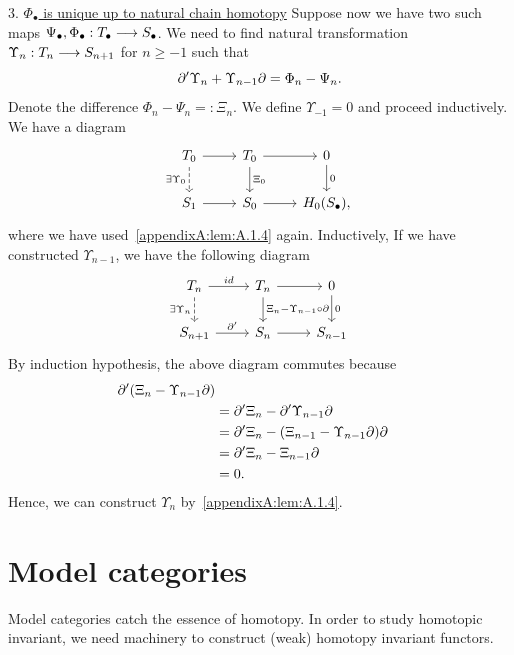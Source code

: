 \documentclass[11pt]{book} %
\begin{document}
3. \underline{$\Phi_\bullet$ is unique up to natural chain homotopy} Suppose now we have two such maps $\Psi_\bullet,\Phi_\bullet: T_\bullet\longrightarrow S_\bullet$. We need to find natural transformation $\Upsilon_n: T_{n}\longrightarrow S_{n+1}$ for $n\geq -1$ such that 
$$
{\partial}'\Upsilon_n+\Upsilon_{n-1}{\partial}=\Phi_n-\Psi_n.
$$
Denote the difference $\Phi_n-\Psi_n=:\Xi_n$. We define $\Upsilon_{-1}=0$ and proceed inductively. We have a diagram
\[
\begin{tikzcd}
T_0 \arrow[r] \arrow[d, "\exists\Upsilon_0"', dashed] & T_0 \arrow[d, "\Xi_0"] \arrow[r] & 0 \arrow[d, "0"] \\
S_1 \arrow[r] & S_0 \arrow[r] & H_0(S_\bullet),
\end{tikzcd}
\]
where we have used~\ref{appendixA:lem:A.1.4} again. Inductively, If we have constructed $\Upsilon_{n-1}$, we have the following diagram
\[
\begin{tikzcd}
T_n \arrow[r, "id"] \arrow[d, "\exists \Upsilon_{n}"', dashed] & T_n \arrow[d, "\Xi_n-\Upsilon_{n-1}\circ\pd"] \arrow[r] & 0 \arrow[d, "0"] \\
S_{n+1} \arrow[r, "\pd'"] & S_n \arrow[r] & S_{n-1}
\end{tikzcd}
\] 
By induction hypothesis, the above diagram commutes because
$$
\begin{aligned}
{\partial}'(\Xi_n-\Upsilon_{n-1}{\partial})\\
&={\partial}'\Xi_n-{\partial}'\Upsilon_{n-1}{\partial}\\
&={\partial}'\Xi_n-(\Xi_{n-1}-\Upsilon_{n-1}{\partial}){\partial}\\
&={\partial}'\Xi_n-\Xi_{n-1}{\partial}\\
&=0.
\end{aligned}
$$
Hence, we can construct $\Upsilon_{n}$ by~\ref{appendixA:lem:A.1.4}.





\section{Model categories}
Model categories catch the essence of homotopy. In order to study homotopic invariant, we need machinery to construct (weak) homotopy invariant functors.
\end{document}
